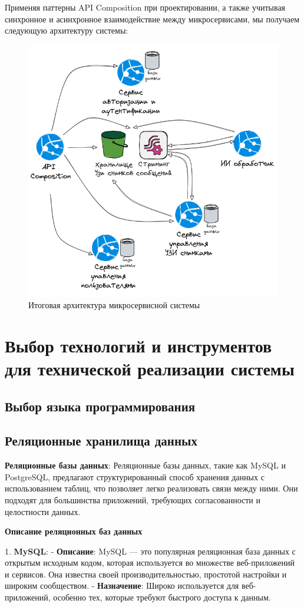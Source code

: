 Применяя паттерны API Composition при проектировании, а также учитывая синхронное и асинхронное взаимодействие между микросервисами,
мы получаем следующую архитектуру системы:
\begin{figure}[H]%
	\begin{center}
		\includegraphics[width=.6\columnwidth]{./img/new/microservice_arch.png}%
	\end{center}
	\caption{Итоговая архитектура микросервисной системы}%
	\label{pic:microservice_arch}%
\end{figure}

\section{Выбор технологий и инструментов для технической реализации системы}

\subsection{Выбор языка программирования}
\subsection{Реляционные хранилища данных}
\textbf{Реляционные базы данных}: Реляционные базы данных, такие как MySQL и PostgreSQL, предлагают структурированный способ хранения данных с использованием таблиц, что позволяет легко реализовать связи между ними. Они подходят для большинства приложений, требующих согласованности и целостности данных.

\textbf{Описание реляционных баз данных}

1. \textbf{MySQL}:
   - \textbf{Описание}: MySQL — это популярная реляционная база данных с открытым исходным кодом, которая используется во множестве веб-приложений и сервисов. Она известна своей производительностью, простотой настройки и широким сообществом.
   - \textbf{Назначение}: Широко используется для веб-приложений, особенно тех, которые требуют быстрого доступа к данным.

